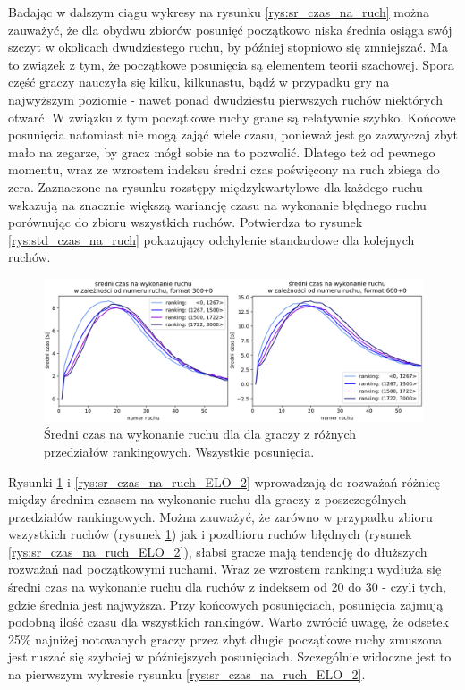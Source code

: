 \documentclass[inzynierska]{pwr_wmat_praca_dyplomowa}
\theoremstyle{plain}
\numberwithin{theorem}{chapter}
\theoremstyle{definition}
\numberwithin{theorem}{chapter}
\begin{document}
Badając w dalszym ciągu wykresy na rysunku \ref{rys:sr_czas_na_ruch} można zauważyć, że dla obydwu zbiorów posunięć początkowo niska średnia osiąga swój szczyt w okolicach dwudziestego ruchu, by później stopniowo się zmniejszać. Ma to związek z tym, że początkowe posunięcia są elementem teorii szachowej. Spora część graczy nauczyła się kilku, kilkunastu, bądź w przypadku gry na najwyższym poziomie - nawet ponad dwudziestu pierwszych ruchów niektórych otwarć. W związku z tym początkowe ruchy grane są relatywnie szybko. Końcowe posunięcia natomiast nie mogą zająć wiele czasu, ponieważ jest go zazwyczaj zbyt mało na zegarze, by gracz mógł sobie na to pozwolić. Dlatego też od pewnego momentu, wraz ze wzrostem indeksu średni czas poświęcony na ruch zbiega do zera. Zaznaczone na rysunku rozstępy międzykwartylowe dla każdego ruchu wskazują na znacznie większą wariancję czasu na wykonanie błędnego ruchu porównując do zbioru wszystkich ruchów. Potwierdza to rysunek \ref{rys:std_czas_na_ruch} pokazujący odchylenie standardowe dla kolejnych ruchów. 
\begin{figure}[H]
	\centering
	\includegraphics[width=\textwidth]{sr_czas_na_ruch_ELO_1.png}
	\caption{Średni czas na wykonanie ruchu dla dla graczy z różnych przedziałów rankingowych. Wszystkie posunięcia.}
	\label{rys:sr_czas_na_ruch_ELO_1}
\end{figure}

Rysunki \ref{rys:sr_czas_na_ruch_ELO_1} i \ref{rys:sr_czas_na_ruch_ELO_2} wprowadzają do rozważań różnicę między średnim czasem na wykonanie ruchu dla graczy z poszczególnych przedziałów rankingowych. Można zauważyć, że zarówno w przypadku zbioru wszystkich ruchów (rysunek \ref{rys:sr_czas_na_ruch_ELO_1}) jak i pozdbioru ruchów błędnych (rysunek \ref{rys:sr_czas_na_ruch_ELO_2}), słabsi gracze mają tendencję do dłuższych rozważań nad początkowymi ruchami. Wraz ze wzrostem rankingu wydłuża się średni czas na wykonanie ruchu dla ruchów z indeksem od 20 do 30 - czyli tych, gdzie średnia jest najwyższa. Przy końcowych posunięciach, posunięcia zajmują podobną ilość czasu dla wszystkich rankingów. Warto zwrócić uwagę, że odsetek 25\% najniżej notowanych graczy przez zbyt długie początkowe ruchy zmuszona jest ruszać się szybciej w późniejszych posunięciach. Szczególnie widoczne jest to na pierwszym wykresie rysunku \ref{rys:sr_czas_na_ruch_ELO_2}. 
\end{document}

